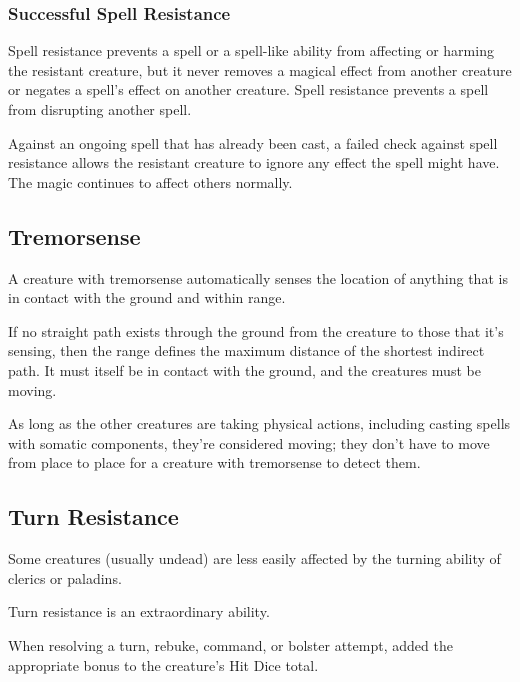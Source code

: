 \subsubsection{Successful Spell Resistance}

Spell resistance prevents a spell or a spell-like ability from affecting or harming 
the resistant creature, but it never removes a magical effect from another creature 
or negates a spell's effect on another creature. Spell resistance prevents a spell 
from disrupting another spell.

Against an ongoing spell that has already been cast, a failed check against spell 
resistance allows the resistant creature to ignore any effect the spell might have. 
The magic continues to affect others normally.

\subsection{Tremorsense}

A creature with tremorsense automatically senses the location of anything that 
is in contact with the ground and within range.

If no straight path exists through the ground from the creature to those that it's 
sensing, then the range defines the maximum distance of the shortest indirect path. 
It must itself be in contact with the ground, and the creatures must be moving. 

As long as the other creatures are taking physical actions, including casting spells 
with somatic components, they're considered moving; they don't have to move from 
place to place for a creature with tremorsense to detect them.

\subsection{Turn Resistance}

Some creatures (usually undead) are less easily affected by the turning ability 
of clerics or paladins.

Turn resistance is an extraordinary ability.

When resolving a turn, rebuke, command, or bolster attempt, added the appropriate 
bonus to the creature's Hit Dice total. 
